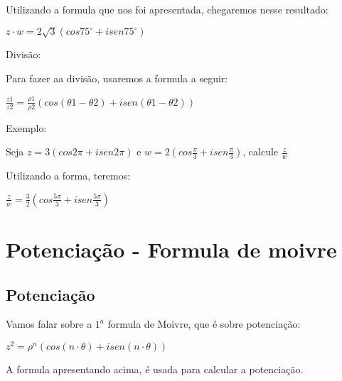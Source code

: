 \documentclass[]{article}
\begin{document}
\begin{large}
\begin{flushleft}
Utilizando a formula que nos foi apresentada, chegaremos nesse resultado: \vspace{.3cm}

\begin{center}
    $z \cdot w = 2\sqrt{3}(cos75^\circ+isen75^\circ)$ \vspace{.3cm}
\end{center}

Divisão: \vspace{.3cm}

Para fazer aa divisão, usaremos a formula a seguir: \vspace{.3cm}

\begin{center}
    $\frac{z1}{z2}=\frac{\rho1}{\rho2}(cos(\theta1-\theta2) + isen(\theta1 - \theta2))$ \vspace{.3cm}
\end{center}

Exemplo: \vspace{.3cm}

Seja $z=3(cos2\pi+isen2\pi)$ e $w=2(cos\frac{\pi}{3} + isen\frac{\pi}{3})$, calcule $\frac{z}{w}$

Utilizando a forma, teremos: \vspace{.3cm}

\begin{center}
    $\frac{z}{w}=\frac{3}{2}(cos\frac{5\pi}{3} + isen\frac{5\pi}{3})$ \vspace{.3cm}
\end{center}

\section{Potenciação - Formula de moivre}

\subsection{Potenciação}

Vamos falar sobre a $1^a$ formula de Moivre, que é sobre potenciação: \vspace{.3cm}

\begin{center}
    $z^2=\rho^n(cos(n \cdot \theta)+isen(n \cdot \theta))$ \vspace{.3cm}
\end{center}

A formula apresentando acima, é usada para calcular a potenciação.


\end{flushleft}
\end{large}
\end{document}
